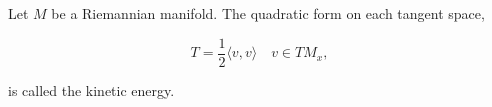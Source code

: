 Let $M$ be a Riemannian manifold. The quadratic form on each tangent space,

$$T = \frac{1}{2} \langle v, v \rangle \quad v \in TM_x,$$

is called the kinetic energy.
